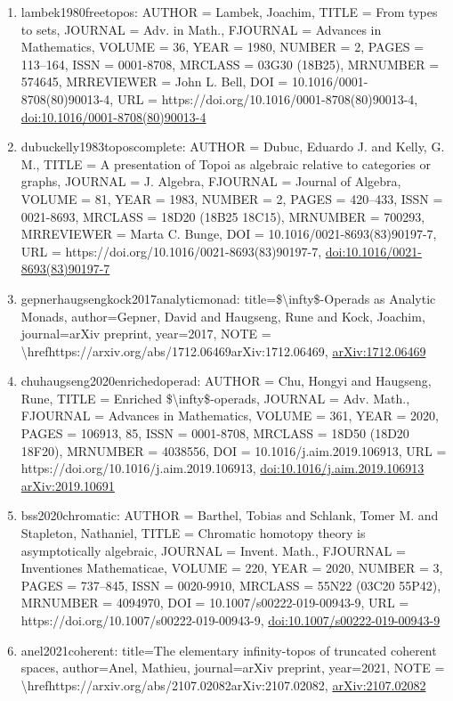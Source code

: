\documentclass[11pt]{article}
\begin{document}
\begin{enumerate}[leftmargin=*]
  \item lambek1980freetopos: AUTHOR = Lambek, Joachim, TITLE = From types to sets, JOURNAL = Adv. in Math., FJOURNAL = Advances in Mathematics, VOLUME = 36, YEAR = 1980, NUMBER = 2, PAGES = 113--164, ISSN = 0001-8708, MRCLASS = 03G30 (18B25), MRNUMBER = 574645, MRREVIEWER = John L. Bell, DOI = 10.1016/0001-8708(80)90013-4, URL = https://doi.org/10.1016/0001-8708(80)90013-4, \href{https://doi.org/10.1016/0001-8708(80)90013-4}{doi:10.1016/0001-8708(80)90013-4}
  \item dubuckelly1983toposcomplete: AUTHOR = Dubuc, Eduardo J. and Kelly, G. M., TITLE = A presentation of Topoi as algebraic relative to categories or graphs, JOURNAL = J. Algebra, FJOURNAL = Journal of Algebra, VOLUME = 81, YEAR = 1983, NUMBER = 2, PAGES = 420--433, ISSN = 0021-8693, MRCLASS = 18D20 (18B25 18C15), MRNUMBER = 700293, MRREVIEWER = Marta C. Bunge, DOI = 10.1016/0021-8693(83)90197-7, URL = https://doi.org/10.1016/0021-8693(83)90197-7, \href{https://doi.org/10.1016/0021-8693(83)90197-7}{doi:10.1016/0021-8693(83)90197-7}
  \item gepnerhaugsengkock2017analyticmonad: title=\$\textbackslash{}infty\$-Operads as Analytic Monads, author=Gepner, David and Haugseng, Rune and Kock, Joachim, journal=arXiv preprint, year=2017, NOTE = \textbackslash{}hrefhttps://arxiv.org/abs/1712.06469arXiv:1712.06469, \href{https://arxiv.org/abs/1712.06469}{arXiv:1712.06469}
  \item chuhaugseng2020enrichedoperad: AUTHOR = Chu, Hongyi and Haugseng, Rune, TITLE = Enriched \$\textbackslash{}infty\$-operads, JOURNAL = Adv. Math., FJOURNAL = Advances in Mathematics, VOLUME = 361, YEAR = 2020, PAGES = 106913, 85, ISSN = 0001-8708, MRCLASS = 18D50 (18D20 18F20), MRNUMBER = 4038556, DOI = 10.1016/j.aim.2019.106913, URL = https://doi.org/10.1016/j.aim.2019.106913, \href{https://doi.org/10.1016/j.aim.2019.106913}{doi:10.1016/j.aim.2019.106913} \href{https://arxiv.org/abs/2019.10691}{arXiv:2019.10691}
  \item bss2020chromatic: AUTHOR = Barthel, Tobias and Schlank, Tomer M. and Stapleton, Nathaniel, TITLE = Chromatic homotopy theory is asymptotically algebraic, JOURNAL = Invent. Math., FJOURNAL = Inventiones Mathematicae, VOLUME = 220, YEAR = 2020, NUMBER = 3, PAGES = 737--845, ISSN = 0020-9910, MRCLASS = 55N22 (03C20 55P42), MRNUMBER = 4094970, DOI = 10.1007/s00222-019-00943-9, URL = https://doi.org/10.1007/s00222-019-00943-9, \href{https://doi.org/10.1007/s00222-019-00943-9}{doi:10.1007/s00222-019-00943-9}
  \item anel2021coherent: title=The elementary infinity-topos of truncated coherent spaces, author=Anel, Mathieu, journal=arXiv preprint, year=2021, NOTE = \textbackslash{}hrefhttps://arxiv.org/abs/2107.02082arXiv:2107.02082, \href{https://arxiv.org/abs/2107.02082}{arXiv:2107.02082}

\end{enumerate}
\end{document}
